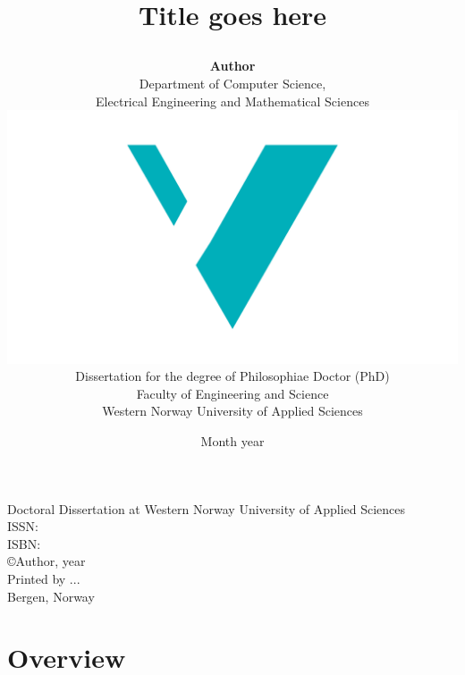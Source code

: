 \documentclass[10pt]{book} %
\title{
{\fontsize{28}{30}\usefont{OT1}{phv}{bc}{n}\selectfont Title goes here}
	\author{
	\textbf{Author}\vspace{1cm}\\
		Department of Computer Science, \\ 
		Electrical Engineering and Mathematical Sciences \vspace{1cm}\\
		\includegraphics[scale=0.36]{logos/logo.pdf}\vspace{2em}\\
		Dissertation for the degree of Philosophiae Doctor (PhD)\vspace{0.5em}\\
		Faculty of Engineering and Science \vspace{0.3cm}\\
		Western Norway University of Applied Sciences
	}
	\date{Month year}
}
\begin{document}

\ifDownscaledFinalDoc
	\fontsize{\TextSize}{\BaseLineSkip}
	\selectfont
\fi

\ifDraft              
	\doublespacing   
\fi


\maketitle
\thispagestyle{empty}
\normalsize\vspace*{15cm}
\begin{minipage}{13cm}
Doctoral Dissertation at Western Norway University of Applied Sciences\\
ISSN: \\ %
ISBN: \\[2ex] %
\copyright{Author}, year\\[2ex] %
Printed by ...\\
Bergen, Norway
\end{minipage}



\frontmatter





\tableofcontents

\mainmatter
%
%
\part{\color{Maroon} Overview}
\label{part:1}
\end{document}
